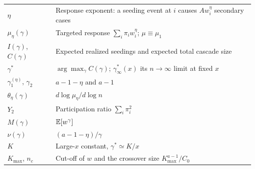 \begin{longtable}{p{2.6cm}p{12.6cm}}
$\eta$ & Response exponent: a seeding event at $i$ causes $Aw_i^\eta$ secondary cases \\
$\mu_\eta(\gamma)$ & Targeted response $\sum_i\pi_iw_i^\eta$; $\mu\equiv\mu_1$ \\
$I(\gamma)$, $C(\gamma)$ & Expected realized seedings and expected total cascade size \\
$\gamma^*$ & $\arg\max_\gamma C(\gamma)$; $\gamma^*_\infty(x)$ its $n\to\infty$ limit at fixed $x$ \\
$\gamma_1^{(\eta)}$, $\gamma_2$ & $a-1-\eta$ and $a-1$ \\
$\theta_\eta(\gamma)$ & $d\log\mu_\eta/d\log n$ \\
$Y_2$ & Participation ratio $\sum_i\pi_i^2$ \\
$M(\gamma)$ & $\mathbb{E}[w^\gamma]$ \\
$\nu(\gamma)$ & $(a-1-\eta)/\gamma$ \\
$K$ & Large-$x$ constant, $\gamma^*\simeq K/x$ \\
$K_{\max}$, $n_c$ & Cut-off of $w$ and the crossover size $K_{\max}^{a-1}/C_0$ \\
\bottomrule
\end{longtable}

